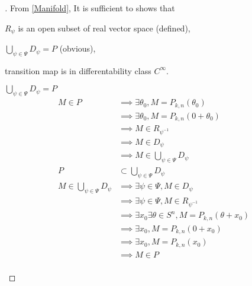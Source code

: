 \documentclass[stu, babel, american, biblatex, a4paper, leqno, draftall]{apa7}
\begin{document}
\begin{proof}[]
    From \cref{Manifold}, It is sufficient to shows that
    \begin{APAenumerate}
        \item $R_\psi$ is an open subset of real vector space (defined),
        \item $\bigcup_{\psi\in\Psi} D_\psi = P$ (obvious),
        \item transition map is in differentability class $C^\infty$.
    \end{APAenumerate}
    \begin{subproof}{$\bigcup_{\psi\in\Psi} D_\psi = P$}
        \begin{align*}
            M \in P
                                         & \implies \exists \theta_0, M=P_{k,n}\left(\theta_0\right)                  \\
                                         & \implies \exists \theta_0, M=P_{k,n}\left(0 + \theta_0\right)              \\
                                         & \implies M\in R_{\psi^{-1}}                                                \\
                                         & \implies M\in D_{\psi}                                                     \\
                                         & \implies M\in \bigcup_{\psi\in\Psi} D_\psi                                 \\
            P                            & \subset\bigcup_{\psi\in\Psi}D_\psi                                         \\
            M\in \bigcup_{\psi\in\Psi} D_\psi
                                         & \implies \exists \psi\in\Psi, M\in D_\psi                                  \\
                                         & \implies \exists \psi\in\Psi, M\in R_{\psi^{-1}}                           \\
                                         & \implies \exists x_0\exists\theta\in S^n, M=P_{k,n}\left(\theta+x_0\right) \\
                                         & \implies \exists x_0, M=P_{k,n}\left(0+x_0\right)                          \\
                                         & \implies \exists x_0, M=P_{k,n}\left(x_0\right)                            \\
                                         & \implies M \in P                                                           \\

\end{align*}
\end{subproof}
\end{proof}
\end{document}
